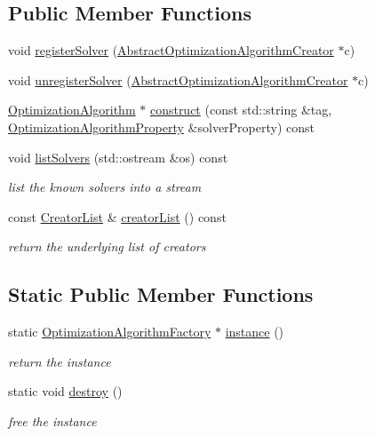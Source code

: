 \subsection*{Public Member Functions}
\begin{DoxyCompactItemize}
\item 
void \mbox{\hyperlink{classg2o_1_1_optimization_algorithm_factory_a7726ae90dc3d5baf62fa364517e0fed7}{register\+Solver}} (\mbox{\hyperlink{classg2o_1_1_abstract_optimization_algorithm_creator}{Abstract\+Optimization\+Algorithm\+Creator}} $\ast$c)
\item 
void \mbox{\hyperlink{classg2o_1_1_optimization_algorithm_factory_adf79430f6176c9e9309a703ba2dbd14b}{unregister\+Solver}} (\mbox{\hyperlink{classg2o_1_1_abstract_optimization_algorithm_creator}{Abstract\+Optimization\+Algorithm\+Creator}} $\ast$c)
\item 
\mbox{\hyperlink{classg2o_1_1_optimization_algorithm}{Optimization\+Algorithm}} $\ast$ \mbox{\hyperlink{classg2o_1_1_optimization_algorithm_factory_a3d48f9c7c6be0428ae3d222d85f65686}{construct}} (const std\+::string \&tag, \mbox{\hyperlink{structg2o_1_1_optimization_algorithm_property}{Optimization\+Algorithm\+Property}} \&solver\+Property) const
\item 
void \mbox{\hyperlink{classg2o_1_1_optimization_algorithm_factory_a89704fe7093e03eb4f2d568a1969bc45}{list\+Solvers}} (std\+::ostream \&os) const
\begin{DoxyCompactList}\small\item\em list the known solvers into a stream \end{DoxyCompactList}\item 
const \mbox{\hyperlink{classg2o_1_1_optimization_algorithm_factory_a3ed210b94bf09b47e30d07da3766b4ec}{Creator\+List}} \& \mbox{\hyperlink{classg2o_1_1_optimization_algorithm_factory_ae17f0e3d3f60e5cda96651a7ded37b4c}{creator\+List}} () const
\begin{DoxyCompactList}\small\item\em return the underlying list of creators \end{DoxyCompactList}\end{DoxyCompactItemize}
\subsection*{Static Public Member Functions}
\begin{DoxyCompactItemize}
\item 
static \mbox{\hyperlink{classg2o_1_1_optimization_algorithm_factory}{Optimization\+Algorithm\+Factory}} $\ast$ \mbox{\hyperlink{classg2o_1_1_optimization_algorithm_factory_a4fe827a82f01c74ef124e7a9a9c98707}{instance}} ()
\begin{DoxyCompactList}\small\item\em return the instance \end{DoxyCompactList}\item 
static void \mbox{\hyperlink{classg2o_1_1_optimization_algorithm_factory_a80b6a74ac262e6192064ec264f965bd7}{destroy}} ()
\begin{DoxyCompactList}\small\item\em free the instance \end{DoxyCompactList}\end{DoxyCompactItemize}
